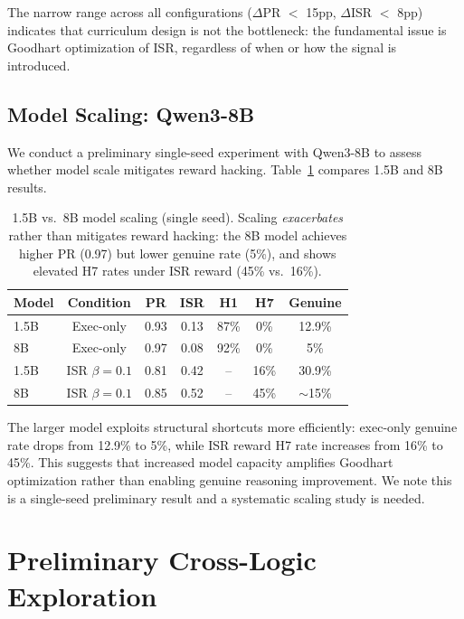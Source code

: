 \documentclass[11pt,a4paper]{article}
\newcommand{\ISR}{\textsc{ISR}}
\begin{document}
The narrow range across all configurations ($\Delta$PR $<$ 15pp, $\Delta$ISR $<$ 8pp) indicates that curriculum design is not the bottleneck: the fundamental issue is Goodhart optimization of ISR, regardless of when or how the signal is introduced.

\subsection{Model Scaling: Qwen3-8B}
\label{sec:scaling}

We conduct a preliminary single-seed experiment with Qwen3-8B to assess whether model scale mitigates reward hacking. Table~\ref{tab:scaling} compares 1.5B and 8B results.

\begin{table}[h]
\centering
\small
\begin{tabular}{lcccccc}
\toprule
\textbf{Model} & \textbf{Condition} & \textbf{PR} & \textbf{\ISR{}} & \textbf{H1} & \textbf{H7} & \textbf{Genuine} \\
\midrule
1.5B & Exec-only & 0.93 & 0.13 & 87\% & 0\% & 12.9\% \\
8B & Exec-only & 0.97 & 0.08 & 92\% & 0\% & 5\% \\
\midrule
1.5B & ISR $\beta{=}0.1$ & 0.81 & 0.42 & -- & 16\% & 30.9\% \\
8B & ISR $\beta{=}0.1$ & 0.85 & 0.52 & -- & 45\% & $\sim$15\% \\
\bottomrule
\end{tabular}
\caption{1.5B vs.\ 8B model scaling (single seed). Scaling \emph{exacerbates} rather than mitigates reward hacking: the 8B model achieves higher PR (0.97) but lower genuine rate (5\%), and shows elevated H7 rates under ISR reward (45\% vs.\ 16\%).}
\label{tab:scaling}
\end{table}

The larger model exploits structural shortcuts more efficiently: exec-only genuine rate drops from 12.9\% to 5\%, while ISR reward H7 rate increases from 16\% to 45\%. This suggests that increased model capacity amplifies Goodhart optimization rather than enabling genuine reasoning improvement. We note this is a single-seed preliminary result and a systematic scaling study is needed.

\section{Preliminary Cross-Logic Exploration}
\label{sec:crosslogic}
\end{document}
